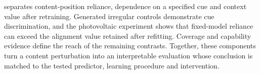 \prism{} separates content-position reliance, dependence on a specified cue and context value after retraining. Generated irregular controls demonstrate cue discrimination, and the photovoltaic experiment shows that fixed-model reliance can exceed the alignment value retained after refitting. Coverage and capability evidence define the reach of the remaining contrasts. Together, these components turn a content perturbation into an interpretable evaluation whose conclusion is matched to the tested predictor, learning procedure and intervention.
